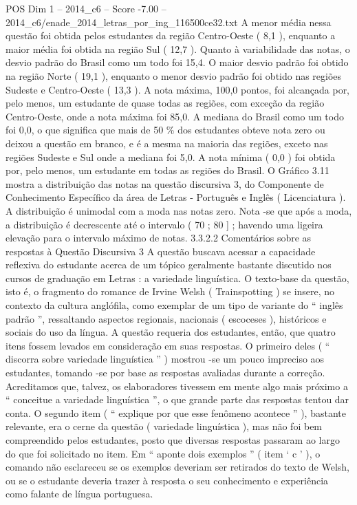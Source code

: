 \begin{textsample}{POS Dim 1 – 2014\_c6 – Score -7.00 – 2014\_c6/enade\_2014\_letras\_por\_ing\_116500ce32.txt}
A menor média nessa questão foi obtida pelos estudantes da região Centro-Oeste ( 8,1 ), enquanto a maior média foi obtida na região Sul ( 12,7 ).
Quanto à variabilidade das notas, o desvio padrão do Brasil como um todo foi 15,4.
O maior desvio padrão foi obtido na região Norte ( 19,1 ), enquanto o menor desvio padrão foi obtido nas regiões Sudeste e Centro-Oeste ( 13,3 ).
A nota máxima, 100,0 pontos, foi alcançada por, pelo menos, um estudante de quase todas as regiões, com exceção da região Centro-Oeste, onde a nota máxima foi 85,0.
A mediana do Brasil como um todo foi 0,0, o que significa que mais de 50 \% dos estudantes obteve nota zero ou deixou a questão em branco, e é a mesma na maioria das regiões, exceto nas regiões Sudeste e Sul onde a mediana foi 5,0.
A nota mínima ( 0,0 ) foi obtida por, pelo menos, um estudante em todas as regiões do Brasil.
O Gráfico 3.11 mostra a distribuição das notas na questão discursiva 3, do Componente de Conhecimento Específico da área de Letras - Português e Inglês ( Licenciatura ).
A distribuição é unimodal com a moda nas notas zero.
Nota -se que após a moda, a distribuição é decrescente até o intervalo ( 70 ; 80 ] ; havendo uma ligeira elevação para o intervalo máximo de notas. 3.3.2.2 Comentários sobre as respostas à Questão Discursiva 3 A questão buscava acessar a capacidade reflexiva do estudante acerca de um tópico geralmente bastante discutido nos cursos de graduação em Letras : a variedade linguística.
O texto-base da questão, isto é, o fragmento do romance de Irvine Welsh ( Trainspotting ) se insere, no contexto da cultura anglófila, como exemplar de um tipo de variante do “ inglês padrão ”, ressaltando aspectos regionais, nacionais ( escoceses ), históricos e sociais do uso da língua.
A questão requeria dos estudantes, então, que quatro itens fossem levados em consideração em suas respostas.
O primeiro deles ( “ discorra sobre variedade linguística ” ) mostrou -se um pouco impreciso aos estudantes, tomando -se por base as respostas avaliadas durante a correção.
Acreditamos que, talvez, os elaboradores tivessem em mente algo mais próximo a “ conceitue a variedade linguística ”, o que grande parte das respostas tentou dar conta.
O segundo item ( “ explique por que esse fenômeno acontece ” ), bastante relevante, era o cerne da questão ( variedade linguística ), mas não foi bem compreendido pelos estudantes, posto que diversas respostas passaram ao largo do que foi solicitado no item.
Em “ aponte dois exemplos ” ( item ‘ c ’ ), o comando não esclareceu se os exemplos deveriam ser retirados do texto de Welsh, ou se o estudante deveria trazer à resposta o seu conhecimento e experiência como falante de língua portuguesa.

\end{textsample}
